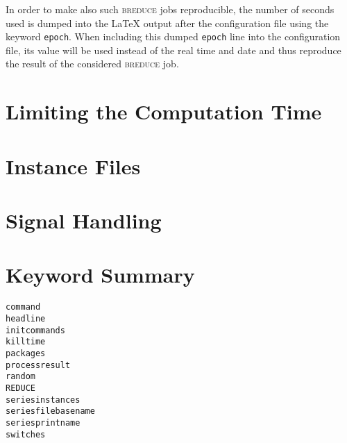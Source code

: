 \documentclass[a4paper]{article}
\begin{document}
In order to make also such \textsc{breduce} jobs reproducible, the
number of seconds used is dumped into the \LaTeX{} output after the
configuration file using the keyword \texttt{epoch}. When including
this dumped \texttt{epoch} line into the configuration file, its value
will be used instead of the real time and date and thus reproduce the
result of the considered \textsc{breduce} job.

\section{Limiting the Computation Time}

\section{Instance Files}\label{SE:files}

\section{Signal Handling}

\section{Keyword Summary}
\begin{description}
\item[\texttt{command}]
\item[\texttt{headline}]
\item[\texttt{initcommands}]
\item[\texttt{killtime}]
\item[\texttt{packages}]
\item[\texttt{processresult}]
\item[\texttt{random}]
\item[\texttt{REDUCE}]
\item[\texttt{seriesinstances}]
\item[\texttt{seriesfilebasename}]
\item[\texttt{seriesprintname}]
\item[\texttt{switches}]
\end{description}



\end{document}
